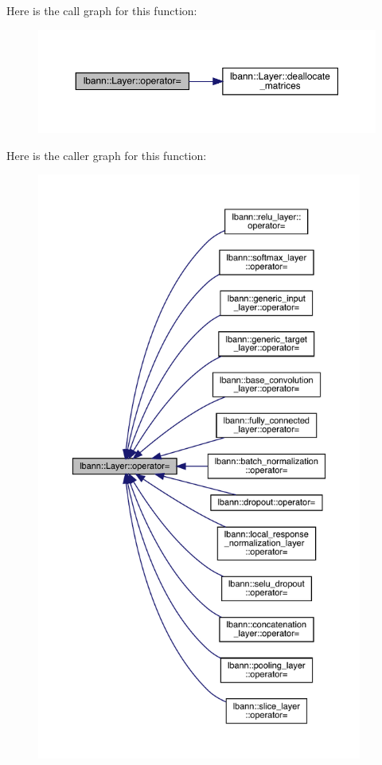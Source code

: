 Here is the call graph for this function\+:\nopagebreak
\begin{figure}[H]
\begin{center}
\leavevmode
\includegraphics[width=350pt]{classlbann_1_1Layer_a00d8acde68fda2f38c4a39ef8c89234a_cgraph}
\end{center}
\end{figure}
Here is the caller graph for this function\+:\nopagebreak
\begin{figure}[H]
\begin{center}
\leavevmode
\includegraphics[height=550pt]{classlbann_1_1Layer_a00d8acde68fda2f38c4a39ef8c89234a_icgraph}
\end{center}
\end{figure}
\mbox{\label{classlbann_1_1Layer_ae9df4e0b0fe7c276c79575f9e11c53af}} 
